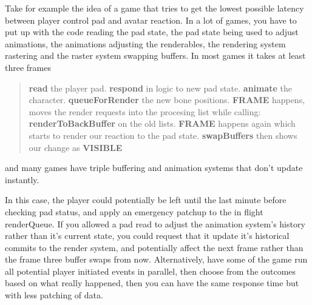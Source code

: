 Take for example the idea of a game that tries to get the lowest possible
latency between player control pad and avatar reaction. In a lot of games, you
have to put up with the code reading the pad state, the pad state being used to
adjust animations, the animations adjusting the renderables, the rendering
system rastering and the raster system swapping buffers. In most games it takes
at least three frames

\begin{quote}
{\bf read} the player pad. \newline
{\bf respond} in logic to new pad state. \newline
{\bf animate} the character. \newline
{\bf queueForRender} the new bone positions. \newline
{\bf FRAME} happens, moves the render requests into the procesing list while calling: \newline
{\bf renderToBackBuffer} on the old lists. \newline
{\bf FRAME} happens again which starts to render our reaction to the pad state. \newline
{\bf swapBuffers} then shows our change as \newline
{\bf VISIBLE}
\end{quote}

and many games have triple buffering and animation systems that don't update
instantly.

In this case, the player could potentially be left until the last minute before
checking pad status, and apply an emergency patchup to the in flight
renderQueue. If you allowed a pad read to adjust the animation system's history
rather than it's current state, you could request that it update it's
historical commits to the render system, and potentially affect the next frame
rather than the frame three buffer swaps from now. Alternatively, have some of
the game run all potential player initiated events in parallel, then choose
from the outcomes based on what really happened, then you can have the same
response time but with less patching of data.


